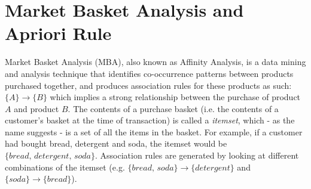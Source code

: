 \documentclass[paper=a4,fontsize=11pt]{report}	%
\newcommand{\setA}{\{A\}}
\newcommand{\setB}{\{B\}}
\newcommand{\abrule}{\setA\rightarrow\setB}
\begin{document}
\section{Market Basket Analysis and Apriori Rule}
\label{mba_define}
Market Basket Analysis (MBA), also known as Affinity Analysis, is a data mining and analysis technique that identifies co-occurrence patterns between products purchased together, and produces association rules for these products as such: $\abrule$ which implies a strong relationship between the purchase of product $A$ and product $B$. The contents of a purchase basket (i.e. the contents of a customer's basket at the time of transaction) is called a \textit{itemset}, which - as the name suggests - is a set of all the items in the basket.  For example, if a customer had bought bread, detergent and soda, the itemset would be $\{\textit{bread, detergent, soda}\}$. Association rules are generated by looking at different combinations of the itemset (e.g. $\{\textit{bread, soda}\}\rightarrow\{\textit{detergent}\}$ and $\{\textit{soda}\}\rightarrow\{\textit{bread}\}$).
\end{document}
